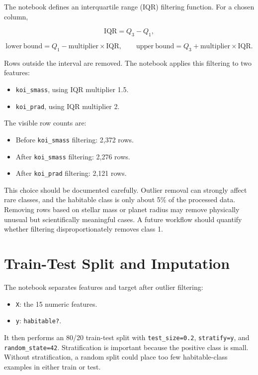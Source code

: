 \documentclass[11pt]{article}
\begin{document}
The notebook defines an interquartile range (IQR) filtering function. For a chosen column,

\[
\mathrm{IQR} = Q_3 - Q_1,
\]

\[
\mathrm{lower\ bound} = Q_1 - \mathrm{multiplier} \times \mathrm{IQR},
\qquad
\mathrm{upper\ bound} = Q_3 + \mathrm{multiplier} \times \mathrm{IQR}.
\]

Rows outside the interval are removed. The notebook applies this filtering to two features:

\begin{itemize}
  \item \texttt{koi\_smass}, using IQR multiplier 1.5.
  \item \texttt{koi\_prad}, using IQR multiplier 2.
\end{itemize}

The visible row counts are:

\begin{itemize}
  \item Before \texttt{koi\_smass} filtering: 2,372 rows.
  \item After \texttt{koi\_smass} filtering: 2,276 rows.
  \item After \texttt{koi\_prad} filtering: 2,121 rows.
\end{itemize}

This choice should be documented carefully. Outlier removal can strongly affect rare classes, and the habitable class is only about 5\% of the processed data. Removing rows based on stellar mass or planet radius may remove physically unusual but scientifically meaningful cases. A future workflow should quantify whether filtering disproportionately removes class 1.

\section{Train-Test Split and Imputation}

The notebook separates features and target after outlier filtering:

\begin{itemize}
  \item \texttt{X}: the 15 numeric features.
  \item \texttt{y}: \texttt{habitable?}.
\end{itemize}

It then performs an 80/20 train-test split with \texttt{test\_size=0.2}, \texttt{stratify=y}, and \texttt{random\_state=42}. Stratification is important because the positive class is small. Without stratification, a random split could place too few habitable-class examples in either train or test.
\end{document}
